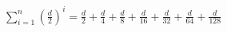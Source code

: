 \documentclass[preview]{standalone}
\begin{document}
\begin{align*}
\sum_{i=1}^n \left(\frac{d}{2}\right)^i= \frac{d}{2} + \frac{d}{4} + \frac{d}{8} + \frac{d}{16} + \frac{d}{32} + \frac{d}{64} + \frac{d}{128}
\end{align*}
\end{document}
